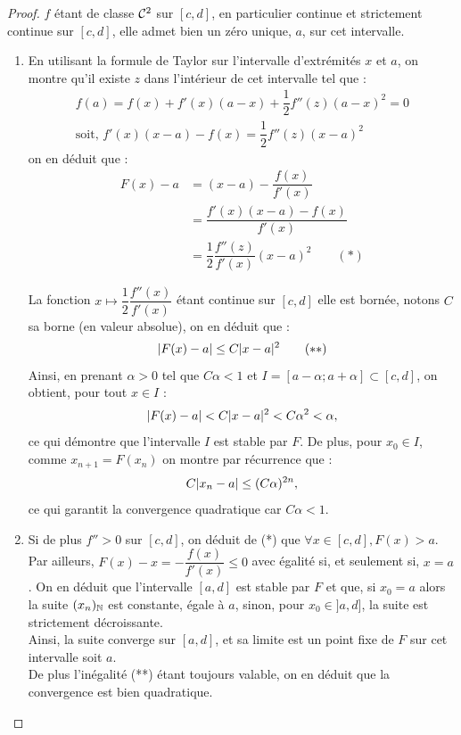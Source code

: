 \begin{proof}
$f$ étant de classe $\mathcal{C}^2$ sur $[c,d]$, en particulier continue et strictement continue sur $[c,d]$, elle admet bien un zéro unique, $a$, 
sur cet intervalle. 

\begin{enumerate}[label=(\roman*)]

\item En utilisant la formule de Taylor sur l'intervalle d'extrémités $x$ et $a$, 
on montre qu'il existe $z$ dans l'intérieur de cet intervalle tel que :
\begin{gather*}
f(a) = f(x) + f'(x)(a-x) + \dfrac12 f''(z)(a-x)^2 = 0 \\
\text{soit, } f'(x)(x-a) - f(x) = \dfrac12 f''(z)(x-a)^2
\end{gather*}
on en déduit que : 
\begin{align*}
F(x) - a & = (x-a) - \dfrac{f(x)}{f'(x)} \\
 & = \dfrac{f'(x)(x-a) - f(x)}{f'(x)} \\
 & = \dfrac12 \dfrac{f''(z)}{f'(x)}(x-a)^2 \qquad (*)
\end{align*}

La fonction $x \mapsto \dfrac12 \dfrac{f''(x)}{f'(x)}$ étant continue sur $[c,d]$ elle est bornée, notons $C$ sa borne (en valeur absolue), 
on en déduit que :
\[ \lvert F(x)-a\rvert \leq C \lvert x-a\rvert^2 \qquad (**) \]
Ainsi, en prenant $\alpha > 0$ tel que $C \alpha < 1$ et $I = [a-\alpha ; a+\alpha] \subset [c,d]$, on obtient, pour tout $x \in I$ :
\[ \lvert F(x) - a\rvert < C\lvert x-a\rvert^2 < C \alpha^2 < \alpha , \]
ce qui démontre que l'intervalle $I$ est stable par $F$. 
De plus, pour $x_0 \in I$, comme $x_{n+1} = F(x_n)$ on montre par récurrence que :
\[ C \lvert x_n - a\rvert  \leq  ( C \alpha)^{2n} , \]
ce qui garantit la convergence quadratique car $C \alpha < 1$.

\item Si de plus $f''>0$ sur $[c,d]$, on déduit de (*) que $\forall x \in [c,d], F(x) > a$.
Par ailleurs, $F(x)-x = - \dfrac{f(x)}{f'(x)} \leq 0$ avec égalité si, et seulement si, $x=a$. 
On en déduit que l'intervalle $[a,d]$ est stable par $F$ et que, si $x_0 = a$ alors la suite $(x_n)_{\mathbb{N}}$ est constante, égale à $a$, 
sinon, pour $x_0 \in ]a,d]$, la suite est strictement décroissante. \\
Ainsi, la suite converge sur $[a,d]$, et sa limite est un point fixe de $F$ sur cet intervalle soit $a$. \\
De plus  l'inégalité (**) étant toujours valable, on en déduit que la convergence est bien quadratique.
\end{enumerate}
\end{proof}


